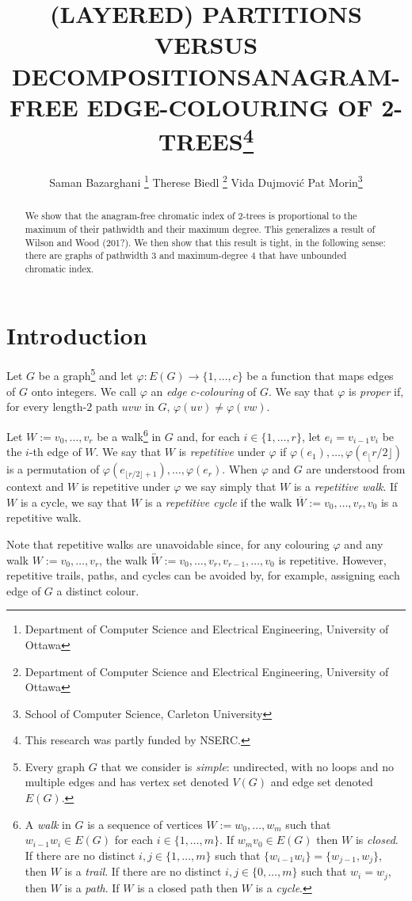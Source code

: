 \documentclass[kpfonts]{patmorin}
\title{\MakeUppercase{(Layered) Partitions versus Decompositions}}
\author{}
\title{\MakeUppercase{Anagram-Free Edge-Colouring of 2-Trees}\thanks{This research was partly funded by NSERC.}}
\author{Saman Bazarghani%
    \thanks{Department of Computer Science and Electrical Engineering, University of Ottawa}\qquad
    Therese Biedl%
    \thanks{Department of Computer Science and Electrical Engineering, University of Ottawa}\qquad
    Vida Dujmović\footnotemark[2]\qquad
    Pat Morin\footnotemark[3]%
    \thanks{School of Computer Science, Carleton University}}
\begin{document}
\maketitle

\begin{abstract}
    We show that the anagram-free chromatic index of $2$-trees is proportional to the maximum of their pathwidth and their maximum degree. This generalizes a result of Wilson and Wood (201?). We then show that this result is tight, in the following sense: there are graphs of pathwidth $3$ and maximum-degree $4$ that have unbounded chromatic index.
\end{abstract}

\section{Introduction}

Let $G$ be a graph\footnote{Every graph $G$ that we consider is \emph{simple}: undirected, with no loops and no multiple edges and has vertex set denoted $V(G)$ and edge set denoted $E(G)$.} and let $\varphi:E(G)\to\{1,\ldots,c\}$ be a function that maps edges of $G$ onto integers.  We call $\varphi$ an \emph{edge $c$-colouring} of $G$.  We say that $\varphi$ is \emph{proper} if, for every length-$2$ path $uvw$ in $G$, $\varphi(uv)\neq\varphi(vw)$.

Let $W:=v_0,\ldots,v_{r}$ be a walk\footnote{A \emph{walk} in $G$ is a sequence of vertices $W:=w_0,\ldots,w_m$ such that $w_{i-1}w_i\in E(G)$ for each $i\in\{1,\ldots,m\}$. If $w_{m}v_0\in E(G)$ then $W$ is \emph{closed}.  If there are no distinct $i,j\in\{1,\ldots,m\}$ such that $\{w_{i-1}w_i\}=\{w_{j-1},w_j\}$, then $W$ is a \emph{trail}.  If there are no distinct $i,j\in\{0,\ldots,m\}$ such that $w_i=w_j$, then $W$ is a \emph{path}.  If $W$ is a closed path then $W$ is a \emph{cycle}.} in $G$ and, for each $i\in\{1,\ldots,r\}$, let $e_i=v_{i-1}v_i$ be the $i$-th edge of $W$. We say that $W$ is \emph{repetitive} under $\varphi$ if $\varphi(e_1),\ldots,\varphi(e_\lfloor r/2\rfloor)$ is a permutation of $\varphi(e_{\lfloor r/2\rfloor+1}),\ldots,\varphi(e_{r})$.  When $\varphi$ and $G$ are understood from context and $W$ is repetitive under $\varphi$ we say simply that $W$ is a \emph{repetitive walk}.  If $W$ is a cycle, we say that $W$ is a \emph{repetitive cycle} if the walk $\overline{W}:=v_0,\ldots,v_r,v_0$ is a repetitive walk.

Note that repetitive walks are unavoidable since, for any colouring $\varphi$ and any walk $W:=v_0,\ldots,v_r$, the walk $\overleftrightarrow{W}:=v_0,\ldots,v_r,v_{r-1},\ldots,v_0$ is repetitive.  However, repetitive trails, paths, and cycles can be avoided by, for example, assigning each edge of $G$ a distinct colour.
\end{document}
